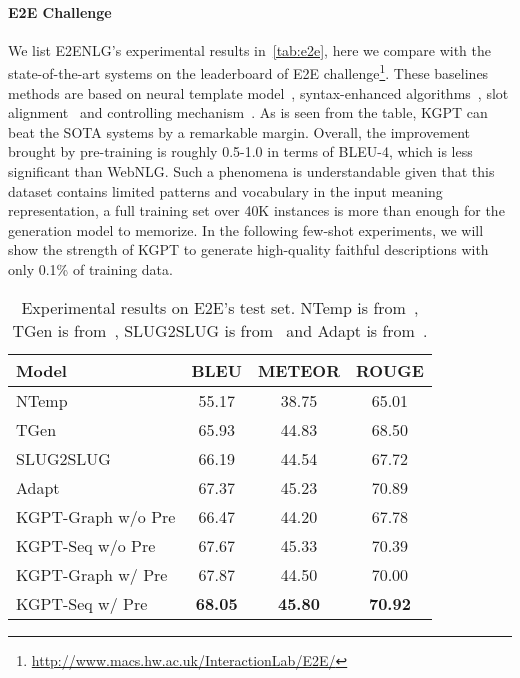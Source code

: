\documentclass[11pt,a4paper]{article}
\newcommand{\model}{KGPT\xspace}
\begin{document}
\paragraph{E2E Challenge}
We list E2ENLG's experimental results in~\autoref{tab:e2e}, here we compare with the state-of-the-art systems on the leaderboard of E2E challenge\footnote{\url{http://www.macs.hw.ac.uk/InteractionLab/E2E/}}. These baselines methods are based on neural template model~\cite{wiseman2018learning}, syntax-enhanced algorithms~\cite{duvsek2016sequence}, slot alignment~\cite{juraska2018deep} and controlling mechanism~\cite{elder2018e2e}. As is seen from the table, \model can beat the SOTA systems by a remarkable margin. Overall, the improvement brought by pre-training is roughly 0.5-1.0 in terms of BLEU-4, which is less significant than WebNLG. Such a phenomena is understandable given that this dataset contains limited patterns and vocabulary in the input meaning representation, a full training set over 40K instances is more than enough for the generation model to memorize. In the following few-shot experiments, we will show the strength of \model to generate high-quality faithful descriptions with only 0.1\% of training data.
\begin{table}[!t]
\small
\begin{tabular}{lccc}
\hline
Model              & BLEU  & METEOR & ROUGE \\
\hline
NTemp              & 55.17 & 38.75 &  65.01 \\
TGen               & 65.93 & 44.83  & 68.50   \\
SLUG2SLUG          & 66.19 & 44.54  & 67.72   \\
Adapt              & 67.37 & 45.23  & 70.89   \\
\hline
\model-Graph w/o Pre & 66.47 & 44.20  & 67.78   \\
\model-Seq w/o Pre & 67.67  & 45.33 & 70.39 \\
\hline
\model-Graph w/ Pre    &  67.87     & 44.50   &  70.00    \\
\model-Seq w/ Pre     &  \textbf{68.05}      & \textbf{45.80}    & \textbf{70.92} \\
\hline
\end{tabular}
\caption{Experimental results on E2E's test set. NTemp is from~\citet{wiseman2018learning}, TGen is from~\citet{duvsek2016sequence}, SLUG2SLUG is from~\citet{juraska2018deep} and Adapt is from~\citet{elder2018e2e}. }
\label{tab:e2e}
\vspace{-2ex}
\end{table}
\end{document}
